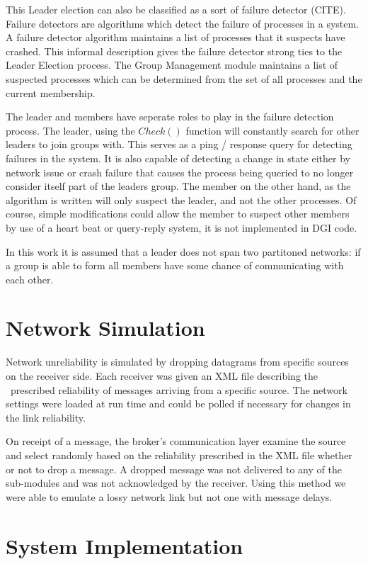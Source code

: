 This Leader election can also be classified as a sort of failure detector 
(CITE).
Failure detectors are algorithms which detect the failure of processes in a 
system.
A failure detector algorithm maintains a list of processes that it suspects have
crashed. This informal description gives the failure detector strong ties to the
Leader Election process. The Group Management module maintains a list of 
suspected
processes which can be determined from the set of all processes and the current
membership. 

The leader and members have seperate roles to play in the failure detection
process. The leader, using the $Check()$ function will constantly search for 
other
leaders to join groups with. This serves as a ping / response query for 
detecting
failures in the system. It is also capable of detecting a change in state either
by network issue or crash failure that causes the process being queried to no 
longer
consider itself part of the leaders group. The member on the other hand, as the
algorithm is written will only suspect the leader, and not the other processes.
Of course, simple modifications could allow the member to suspect other members
by use of a heart beat or query-reply system, it is not implemented in DGI code.

In this work it is assumed that a leader does not span two partitoned networks:
if a group is able to form all members have some chance of communicating with
each other.


\section{Network Simulation}

Network unreliability is simulated by dropping datagrams from specific sources 
on the receiver side. Each receiver was given an XML file describing the 
 prescribed reliability of messages arriving from a specific source. The 
network settings were loaded at run time and could be polled if necessary for 
changes in the link reliability.

On receipt of a message, the broker's communication layer examine the source 
and select randomly based on the reliability prescribed in the XML file whether 
or not to drop a message. A dropped message was not delivered to any of the 
sub-modules and was not acknowledged by the receiver. Using this method we were 
able to emulate a lossy network link but not one with message delays.

\section{System Implementation}

